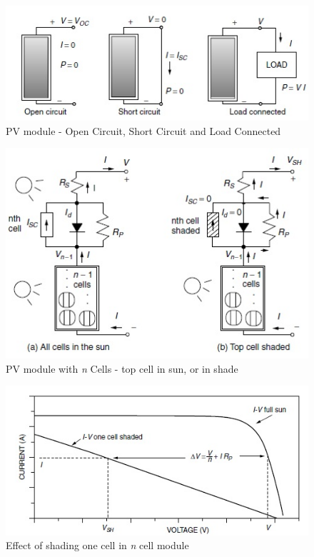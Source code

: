 \documentclass[12pt]{article}
\begin{document}
\begin{figure}[H]
\centering
\includegraphics[scale=0.5]{pv7}
\caption{PV module - Open Circuit, Short Circuit and Load Connected}
\label{figc3h777} %
\end{figure}

\begin{figure}[H]
\centering
\includegraphics[scale=0.5]{shading1}
\caption{PV module with \textit{n} Cells - top cell in sun, or in shade}
\label{figc3h888} %
\end{figure}

\begin{figure}[H]
\centering
\includegraphics[scale=0.5]{shading2}
\caption{Effect of shading one cell in \textit{n} cell module}
\label{figc3h999} %
\end{figure}
\end{document}
